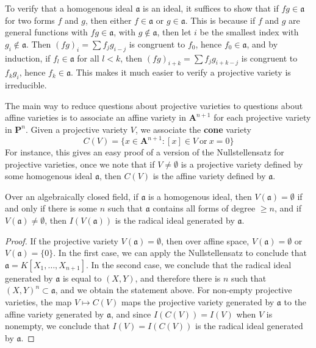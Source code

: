 To verify that a homogenous ideal $\mathfrak{a}$ is an ideal, it suffices to show that if $fg \in \mathfrak{a}$ for two forms $f$ and $g$, then either $f \in \mathfrak{a}$ or $g \in \mathfrak{a}$. This is because if $f$ and $g$ are general functions with $fg \in \mathfrak{a}$, with $g \not \in \mathfrak{a}$, then let $i$ be the smallest index with $g_i \not \in \mathfrak{a}$. Then $(fg)_i = \sum f_jg_{i-j}$ is congruent to $f_0$, hence $f_0 \in \mathfrak{a}$, and by induction, if $f_l \in \mathfrak{a}$ for all $l < k$, then $(fg)_{i+k} = \sum f_jg_{i+k-j}$ is congruent to $f_kg_i$, hence $f_k \in \mathfrak{a}$. This makes it much easier to verify a projective variety is irreducible.

The main way to reduce questions about projective varieties to questions about affine varieties is to associate an affine variety in $\mathbf{A}^{n+1}$ for each projective variety in $\mathbf{P}^n$. Given a projective variety $V$, we associate the {\bf cone} variety
%
\[ C(V) = \{ x \in \mathbf{A}^{n+1}: [x] \in V\ \text{or}\ x = 0 \} \]
%
For instance, this gives an easy proof of a version of the Nullstellensatz for projective varieties, once we note that if $V \neq \emptyset$ is a projective variety defined by some homogenous ideal $\mathfrak{a}$, then $C(V)$ is the affine variety defined by $\mathfrak{a}$.

\begin{theorem}
    Over an algebraically closed field, if $\mathfrak{a}$ is a homogenous ideal, then $V(\mathfrak{a}) = \emptyset$ if and only if there is some $n$ such that $\mathfrak{a}$ contains all forms of degree $\geq n$, and if $V(\mathfrak{a}) \neq \emptyset$, then $I(V(\mathfrak{a}))$ is the radical ideal generated by $\mathfrak{a}$.
\end{theorem}
\begin{proof}
    If the projective variety $V(\mathfrak{a}) = \emptyset$, then over affine space, $V(\mathfrak{a}) = \emptyset$ or $V(\mathfrak{a}) = \{ 0 \}$. In the first case, we can apply the Nullstellensatz to conclude that $\mathfrak{a} = K[X_1, \dots, X_{n+1}]$. In the second case, we conclude that the radical ideal generated by $\mathfrak{a}$ is equal to $(X,Y)$, and therefore there is $n$ such that $(X,Y)^n \subset \mathfrak{a}$, and we obtain the statement above. For non-empty projective varieties, the map $V \mapsto C(V)$ maps the projective variety generated by $\mathfrak{a}$ to the affine variety generated by $\mathfrak{a}$, and since $I(C(V)) = I(V)$ when $V$ is nonempty, we conclude that $I(V) = I(C(V))$ is the radical ideal generated by $\mathfrak{a}$.
\end{proof}

